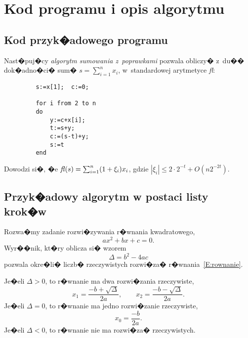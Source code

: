 \documentclass[11pt,wide]{mwart}
\begin{document}
\section{Kod programu i opis algorytmu}

\subsection{Kod przyk�adowego programu}
Nast�puj�cy \textit{algorytm sumowania z~poprawkami} pozwala obliczy�  z~du��
dok�adno�ci� sum� $s=\sum_{i=1}^{n}x_i$, w~standardowej arytmetyce
\textit{fl}:

\begin{verbatim}
         s:=x[1];  c:=0;

         for i from 2 to n
         do
             y:=c+x[i];
             t:=s+y;
             c:=(s-t)+y;
             s:=t
         end
\end{verbatim}

Dowodzi si�, �e $\mbox{\textit{fl}}(s)=\sum_{i=1}^{n}(1+\xi_i)x_i$, gdzie
$|\xi_i|\leq 2\cdot2^{-t}+O(n2^{-2t})$.

\subsection{Przyk�adowy algorytm w postaci listy krok�w}
Rozwa�my zadanie rozwi�zywania r�wnania kwadratowego,
\begin{equation}\label{E:rownanie}
ax^2 + bx + c = 0.
\end{equation}
Wyr��nik, kt�ry oblicza si� wzorem
\begin{equation}\label{E:wyr}
\Delta = b^2 - 4ac
\end{equation}
pozwala okre�li� liczb� rzeczywistych rozwi�za� r�wnania~\eqref{E:rownanie}.

\noindent Je�eli $\Delta > 0$, to r�wnanie ma dwa rozwi�zania rzeczywiste,
\begin{equation}\label{E:rozw1}
x_1 = \frac{-b+\sqrt{\Delta}}{2a}, \qquad x_2 = \frac{-b-\sqrt{\Delta}}{2a}.
\end{equation}
Je�eli $\Delta = 0$, to r�wnanie ma jedno rozwi�zanie rzeczywiste,
\begin{equation}\label{E:rozw2}
x_0 = \frac{-b}{2a}.
\end{equation}
Je�eli $\Delta < 0$, to r�wnanie nie ma rozwi�za� rzeczywistych.
\end{document}
